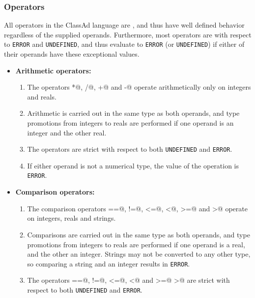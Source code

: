 \subsubsection{Operators}
\label{ClassAd:evaluation-meta}
All operators in the ClassAd language are , and thus have well
defined behavior regardless of the supplied operands.  Furthermore, most
operators are  with respect to \texttt{ERROR} and 
\texttt{UNDEFINED}, and thus evaluate to \texttt{ERROR} (or \texttt{UNDEFINED})
if either of their operands have these exceptional values.

\begin{itemize}
	\item\textbf{Arithmetic operators:}  
	\begin{enumerate}
		\item The operators \verb@*@, \verb@/@, \verb@+@ and \verb@-@ operate 
		arithmetically only on integers and reals.

		\item Arithmetic is carried out in the same type as both operands,
		and type promotions from integers to reals are performed if one operand 
		is an integer and the other real.

		\item The operators are strict with respect to both \texttt{UNDEFINED} 
		and \texttt{ERROR}.  

		\item If either operand is not a numerical type, the value of the
		operation is \texttt{ERROR}.
	\end{enumerate}

	\item\textbf{Comparison operators:}
	\begin{enumerate}
		\item The comparison operators \verb@==@, \verb@!=@, \verb@<=@, 
		\verb@<@, \verb@>=@ and \verb@>@ operate on integers, reals and strings.

		\item Comparisons are carried out in the same type as both operands,
		and type promotions from integers to reals are performed if one operand
		is a real, and the other an integer.  Strings may not be converted to
		any other type, so comparing a string and an integer results in 
		\texttt{ERROR}.

		\item The operators \verb@==@, \verb@!=@, \verb@<=@, \verb@<@ and 
		\verb@>=@ \verb@>@ are strict with respect to both \texttt{UNDEFINED} 
		and \texttt{ERROR}.


\end{enumerate}
\end{itemize}
